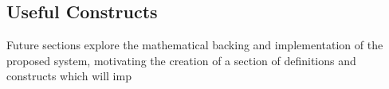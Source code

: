 \subsection{Useful Constructs}

Future sections explore the mathematical backing and implementation of the proposed system, motivating the creation of a section of definitions and constructs which will imp